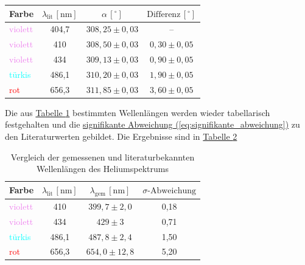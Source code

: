 \begin{table}
    \centering
    \label{tab:auslenkung_wasserstoff}
    \hspace{-1.1cm}
    \begin{tabular}{lccc}
        \hline
        \textbf{Farbe} & \(\lambda_{\text{lit}}\, [\text{nm}]\) & \(\alpha \,[^\circ]\) & \(\text{Differenz}\,[^\circ]\) \\
        \hline
        \textcolor{violet}{violett} & 404,7 & \(308,25 \pm 0,03\) & -- \\
        \midrule
        \textcolor{violet}{violett} & 410 & \(308,50 \pm 0,03\) & \(0,30 \pm 0,05\) \\
        \textcolor{violet}{violett} &  434 & \(309,13 \pm 0,03\) & \(0,90 \pm 0,05\) \\
        \textcolor{cyan}{türkis} & 486,1 & \(310,20 \pm 0,03\) & \(1,90 \pm 0,05\) \\
        \textcolor{red}{rot} & 656,3 & \(311,85 \pm 0,03\) & \(3,60 \pm 0,05\) \\
        \hline
    \end{tabular}
\end{table}


Die aus \hyperref[tab:auslenkung_wasserstoff]{Tabelle \ref*{tab:auslenkung_wasserstoff}} bestimmten Wellenlängen werden wieder tabellarisch festgehalten und die \hyperref[eq:signifikante_abweichung]{signifikante Abweichung (\ref*{eq:signifikante_abweichung})} zu den Literaturwerten gebildet. Die Ergebnisse sind in \hyperref[tab:e_h]{Tabelle \ref*{tab:e_h}}

\begin{table}[h!]
    \centering
    \label{tab:e_h}
    \hspace{-1.1cm}
    \begin{tabular}{lccc}
        \hline
        \textbf{Farbe} & \(\lambda_{\text{lit}}\,[\text{nm}]\) & \(\lambda_{\text{gem}}\,[\text{nm}]\) & \(\sigma\text{-Abweichung}\) \\
        \hline
        \textcolor{violet}{violett} & 410 & \(399,7 \pm 2,0\) & 0,18 \\
        \textcolor{violet}{violett} & 434 & \(429 \pm 3\) & 0,71 \\
        \textcolor{cyan}{türkis} & 486,1 & \(487,8 \pm 2,4\) & 1,50 \\
        \textcolor{red}{rot} & 656,3 & \(654,0 \pm 12,8\) & 5,20 \\
        \hline
    \end{tabular}
    \caption{Vergleich der gemessenen und literaturbekannten Wellenlängen des Heliumspektrums}
\end{table}


